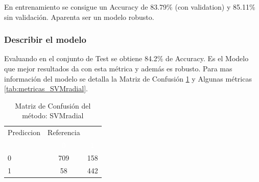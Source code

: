 En entrenamiento se consigue un Accuracy de 83.79\% (con validation) y
85.11\% sin validación. Aparenta ser un modelo robusto.


\subsubsection{Describir el modelo}

Evaluando en el conjunto de Test se obtiene 84.2\% de Accuracy. Es el Modelo que mejor resultados da con esta métrica y además es robusto. Para mas información del modelo se detalla la Matriz de Confusión \ref{tab:MatrizConf_SVMradial} y Algunas métricas \ref{tab:metricas_SVMradial}.

\begin{table}[!h]
	
	\caption{\label{tab:MatrizConf_SVMradial}Matriz de Confusión del método: SVMradial }
	\centering
	\begin{tabular}[t]{lcc}
		\toprule
		\multicolumn{1}{c}{Prediccion} & \multicolumn{1}{c}{Referencia} & \multicolumn{1}{c}{ } \\
		\cmidrule(l{3pt}r{3pt}){1-1} \cmidrule(l{3pt}r{3pt}){2-2}
		\rowcolor{black}  \multicolumn{1}{c}{\textcolor{white}{\textbf{ }}} & \multicolumn{1}{c}{\textcolor{white}{\textbf{0}}} & \multicolumn{1}{c}{\textcolor{white}{\textbf{1}}}\\
		\midrule
		\rowcolor{gray!6}  0 & 709 & 158\\
		1 & 58 & 442\\
		\bottomrule
	\end{tabular}
\end{table}

